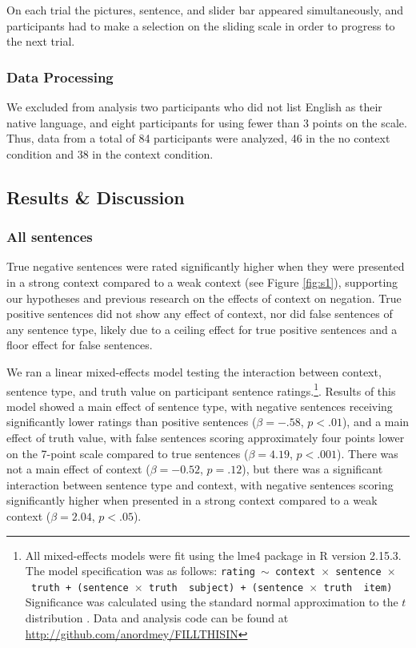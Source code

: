 \documentclass[10pt,letterpaper]{article}
\begin{document}
On each trial the pictures, sentence, and slider bar appeared simultaneously, and participants had to make a selection on the sliding scale in order to progress to the next trial.  

\subsubsection{Data Processing}
We excluded from analysis two participants who did not list English as their native language, and eight participants for using fewer than 3 points on the scale.  Thus, data from a total of 84 participants were analyzed, 46 in the no context condition and 38 in the context condition.  

\subsection{Results \& Discussion}

\subsubsection{All sentences}

True negative sentences were rated significantly higher when they were presented in a strong context compared to a weak context (see Figure \ref{fig:s1}), supporting our hypotheses and previous research on the effects of context on negation.  True positive sentences did not show any effect of context, nor did false sentences of any sentence type, likely due to a ceiling effect for true positive sentences and a floor effect for false sentences.  

We ran a linear mixed-effects model testing the interaction between context, sentence type, and truth value on participant sentence ratings.\footnote{All mixed-effects models were fit using the lme4 package in R version 2.15.3.  The model specification was as follows: \texttt{rating $\sim$ context~$\times$~sentence~$\times$~truth + (sentence~$\times$~truth~\textbar~subject) +  (sentence~$\times$~truth~\textbar~item)}  Significance was calculated using the standard normal approximation to the $t$ distribution \cite{barr2013}. Data and analysis code can be found at \href{http://github.com/anordmey/FILLTHISIN}{http://github.com/anordmey/FILLTHISIN}}.  Results of this model showed a main effect of sentence type, with negative sentences receiving significantly lower ratings than positive sentences ($\beta= -.58$, $p< .01$), and a main effect of truth value, with false sentences scoring approximately four points lower on the 7-point scale compared to true sentences ($\beta= 4.19$, $p< .001$).  There was not a main effect of context ($\beta= -0.52$, $p=.12$), but there was a significant interaction between sentence type and context, with negative sentences scoring significantly higher when presented in a strong context compared to a weak context ($\beta= 2.04$, $p< .05$).  
\end{document}
